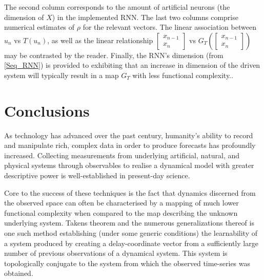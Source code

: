 \documentclass[a4paper,12pt,twoside]{report}
\begin{document}
\begin{center}
\begin{table}
{      The second column corresponds to the amount of artificial neurons (the dimension of $X$) in the implemented RNN.
      The last two columns comprise numerical estimates of $\rho$ for the relevant vectors. The linear association between $u_n$ vs $T(u_{n})$, as well as the linear relationship $\begin{bmatrix}
              x_{n-1}\\
              x_n
          \end{bmatrix}$ vs $G_T \left( \begin{bmatrix}
              x_{n-1}\\
              x_n
          \end{bmatrix}\right)$ may be contrasted by the reader. 
          Finally, the RNN's dimension (from \eqref{Seq_RNN}) is provided to exhibiting that an increase in dimension of the driven system will 
          typically result in a map $G_T$ with less functional complexity.}.
      \end{table}\label{tbl_attractorsPearson}
\end{center}

  



  
\chapter{Conclusions} \label{ch6}


As technology has advanced over the past century, humanity’s ability to record and manipulate rich, complex data in order to produce forecasts has profoundly increased. 
Collecting measurements from underlying artificial, natural, and physical systems through observables to realise a dynamical model with greater descriptive power is well-established in present-day science.

Core to the success of these techniques is the fact that dynamics discerned from the observed space can often be characterised by a mapping of much lower functional complexity when compared to the map describing the unknown underlying system. Takens theorem and the numerous generalizations thereof is one such method establishing (under some generic conditions) the learnability of a system produced by creating a delay-coordinate vector from a sufficiently large number of previous observations of a dynamical system. This system is topologically conjugate to the system from which the observed time-series was obtained.
\end{document}

